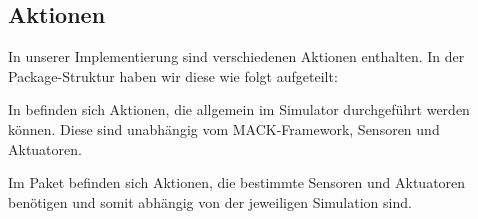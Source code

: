\subsection{Aktionen}\label{subsec:real_actions}
In unserer Implementierung sind verschiedenen Aktionen enthalten. In der Package-Struktur haben wir diese wie folgt aufgeteilt:

In  befinden sich Aktionen, die allgemein im Simulator durchgeführt werden können. Diese sind unabhängig vom MACK-Framework, Sensoren und Aktuatoren.

Im Paket  befinden sich Aktionen, die bestimmte Sensoren und Aktuatoren benötigen und somit abhängig von der jeweiligen Simulation sind.


